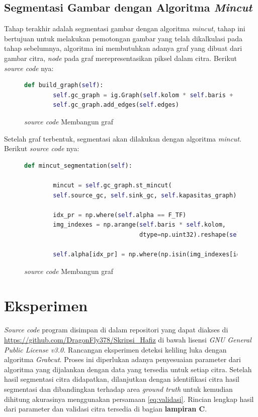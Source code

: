\subsection{Segmentasi Gambar dengan Algoritma \emph{Mincut}}
Tahap terakhir adalah segmentasi gambar dengan algoritma \emph{mincut}, tahap 
ini bertujuan untuk melakukan pemotongan gambar yang telah dikalkulasi pada 
tahap sebelumnya, algoritma ini membutuhkan adanya graf yang dibuat dari gambar 
citra, \emph{node} pada graf merepresentasikan piksel dalam citra. 
Berikut \emph{source code} nya:

\begin{figure}[H]
	\begin{lstlisting}[language=Python, basicstyle=\tiny]
	def build_graph(self):
		self.gc_graph = ig.Graph(self.kolom * self.baris + 1)
		self.gc_graph.add_edges(self.edges)
	\end{lstlisting}
	\caption{\emph{source code} Membangun graf}
	\label{code:build_graph}
\end{figure}

Setelah graf terbentuk, segmentasi akan dilakukan dengan algoritma \emph{mincut}.
Berikut \emph{source code} nya:
\begin{figure}[H]
	\begin{lstlisting}[language=Python, basicstyle=\tiny]
	def mincut_segmentation(self):

        mincut = self.gc_graph.st_mincut(
        self.source_gc, self.sink_gc, self.kapasitas_graph)

        idx_pr = np.where(self.alpha == F_TF)
        img_indexes = np.arange(self.baris * self.kolom,
                                dtype=np.uint32).reshape(self.baris, self.kolom)

        self.alpha[idx_pr] = np.where(np.isin(img_indexes[idx_pr], mincut.partition[0]),F_TF, F_TB)
	\end{lstlisting}
	\caption{\emph{source code} Membangun graf}
	\label{code:mincut_segmentation}
\end{figure}



\section{Eksperimen}
\emph{Source code} program disimpan di dalam repositori yang dapat diakses di
\url{https://github.com/DragonFly378/Skripsi_Hafiz} di bawah lisensi \emph{GNU General Public License v3.0.}
Rancangan eksperimen deteksi keliling luka dengan algoritma \emph{Grabcut}. Proses 
ini diperlukan adanya penyesuaian parameter dari algoritma yang dijalankan dengan 
data yang tersedia untuk setiap citra. Setelah hasil segmentasi citra didapatkan,
dilanjutkan dengan identifikasi citra hasil segmentasi dan dibandingkan terhadap area 
\emph{ground truth} untuk kemudian dihitung akurasinya menggunakan persamaan \ref{eq:validasi}.
Rincian lengkap hasil dari parameter dan validasi citra tersedia di bagian \textbf{lampiran C}.

